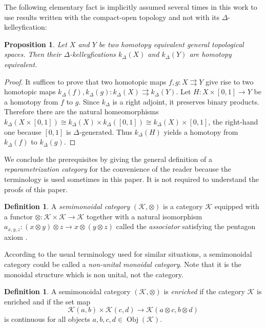\documentclass[a4paper,12pt]{amsart}
\newcommand{\K}{\mathcal{K}}
\newcommand{\p}{\times}
\newtheorem{prop}[thm]{Proposition}
\newcommand{\bp}{\begin{prop}}
\newcommand{\ep}{\end{prop}}
\newcommand{\bpf}{\begin{proof}}
\newcommand{\epf}{\end{proof}}
\theoremstyle{definition}
\newtheorem{defn}[thm]{Definition}
\newcommand{\bd}{\begin{defn}}
\newcommand{\ed}{\end{defn}}
\newcommand{\iso}{\cong}
\newcommand{\ot}{\otimes}
\DeclareMathOperator{\Obj}{Obj}
\begin{document}
The following elementary fact is implicitly assumed several times in this work to use results written with the compact-open topology and not with its $\Delta$-kelleyfication: 

\bp \label{homotopy-deltakelleyfication}
Let $X$ and $Y$ be two homotopy equivalent general topological spaces. Then their $\Delta$-kelleyfications $k_\Delta(X)$ and $k_\Delta(Y)$ are homotopy equivalent.
\ep

\bpf
It suffices to prove that two homotopic maps $f,g:X\rightrightarrows Y$ give rise to two homotopic maps $k_\Delta(f),k_\Delta(g):k_\Delta(X)\rightrightarrows k_\Delta(Y)$. Let $H:X\p [0,1]\to Y$ be a homotopy from $f$ to $g$. Since $k_\Delta$ is a right adjoint, it preserves binary products. Therefore there are the natural homeomorphisms $k_\Delta(X\p [0,1]) \iso k_\Delta(X) \p k_\Delta([0,1]) \iso k_\Delta(X)\p [0,1]$, the right-hand one because $[0,1]$ is $\Delta$-generated. Thus $k_\Delta(H)$ yields a homotopy from $k_\Delta(f)$ to $k_\Delta(g)$.
\epf 

We conclude the prerequisites by giving the general definition of a \textit{reparametrization category} for the convenience of the reader because the terminology is used sometimes in this paper. It is not required to understand the proofs of this paper.

\bd A \textit{semimonoidal category} $(\K,\ot)$ is a category $\K$ equipped with a functor $\ot:\K\p \K\to \K$ together with a natural isomorphism $a_{x,y,z}: (x\ot y) \ot z \to x \ot (y\ot z)$ called the \textit{associator} satisfying the pentagon axiom \cite[diagram~(5) page 158]{MR1712872}. 
\ed

According to the usual terminology used for similar situations, a semimonoidal category could be called a \textit{non-unital monoidal category}. Note that it is the monoidal structure which is non unital, not the category. 


\bd A semimonoidal category $(\K,\ot)$ is \textit{enriched} if the category $\K$ is enriched and if the set map \[\K(a,b)\p \K(c,d) \longrightarrow \K(a\ot c,b\ot d)\] is continuous for all objects $a,b,c,d\in \Obj(\K)$. 
\ed
\end{document}
